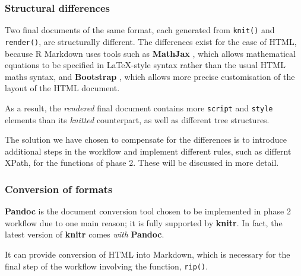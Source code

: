 \documentclass[a4paper, 12pt]{report}
\begin{document}
\newpage
\subsubsection*{Structural differences}
Two final documents of the same format, each generated from \texttt{knit()} and \texttt{render()}, are structurally different. The differences exist for the case of HTML, because R Markdown uses tools such as \textbf{MathJax} \citep{mathjax}, which allows mathematical equations to be specified in LaTeX-style syntax rather than the usual HTML maths syntax, and \textbf{Bootstrap} \citep{bootstrap}, which allows more precise customisation of the layout of the HTML document.

As a result, the \emph{rendered} final document contains more \texttt{script} and \texttt{style} elements than its \emph{knitted} counterpart, as well as different tree structures.

The solution we have chosen to compensate for the differences is to introduce additional steps in the workflow and implement different rules, such as differnt XPath, for the functions of phase 2. These will be discussed in more detail.


\subsubsection*{Conversion of formats}
\textbf{Pandoc} \citep{pandoc} is the document conversion tool chosen to be implemented in phase 2 workflow due to one main reason; it is fully supported by \textbf{knitr}. In fact, the latest version of \textbf{knitr} comes \emph{with} \textbf{Pandoc}.

It can provide conversion of HTML into Markdown, which is necessary for the final step of the workflow involving the function, \texttt{rip()}.


\end{document}
